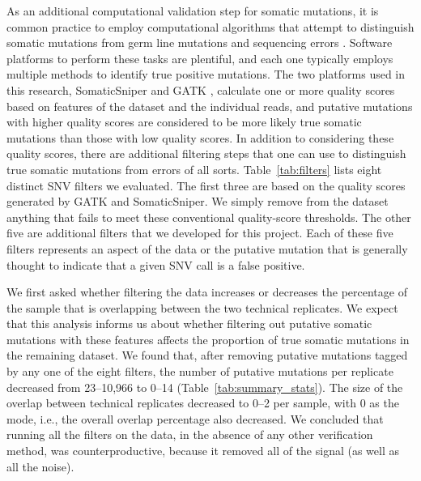 \documentclass[11 pt]{article} %
\begin{document}
As an additional computational validation step for somatic mutations, it is common practice to employ computational algorithms that attempt to distinguish somatic mutations from germ line mutations and sequencing errors \citep{SomaticSniper, mut_calling}. Software platforms to perform these tasks are plentiful, and each one typically employs multiple methods to identify true positive mutations. The two platforms used in this research, SomaticSniper \citep{SomaticSniper} and GATK \citep{GATK}, calculate one or more quality scores based on features of the dataset and the individual reads, and putative mutations with higher quality scores are considered to be more likely true somatic mutations than those with low quality scores. In addition to considering these quality scores, there are additional filtering steps that one can use to distinguish true somatic mutations from errors of all sorts. Table~\ref{tab:filters} lists eight distinct SNV filters we evaluated. The first three are based on the quality scores generated by GATK and SomaticSniper.  We simply remove from the dataset anything that fails to meet these conventional quality-score thresholds. The other five are additional filters that we developed for this project. Each of these five filters represents an aspect of the data or the putative mutation that is generally thought to indicate that a given SNV call is a false positive.

We first asked whether filtering the data increases or decreases the percentage of the sample that is overlapping between the two technical replicates. We expect that this analysis informs us about whether filtering out putative somatic mutations with these features affects the proportion of true somatic mutations in the remaining dataset. We found that, after removing putative mutations tagged by any one of the eight filters, the number of putative mutations per replicate decreased from 23--10,966 to 0--14 (Table~\ref{tab:summary_stats}). The size of the overlap between technical replicates decreased to 0--2 per sample, with 0 as the mode, i.e., the overall overlap percentage also decreased. We concluded that running all the filters on the data, in the absence of any other verification method, was counterproductive, because it removed all of the signal (as well as all the noise). 
\end{document}
